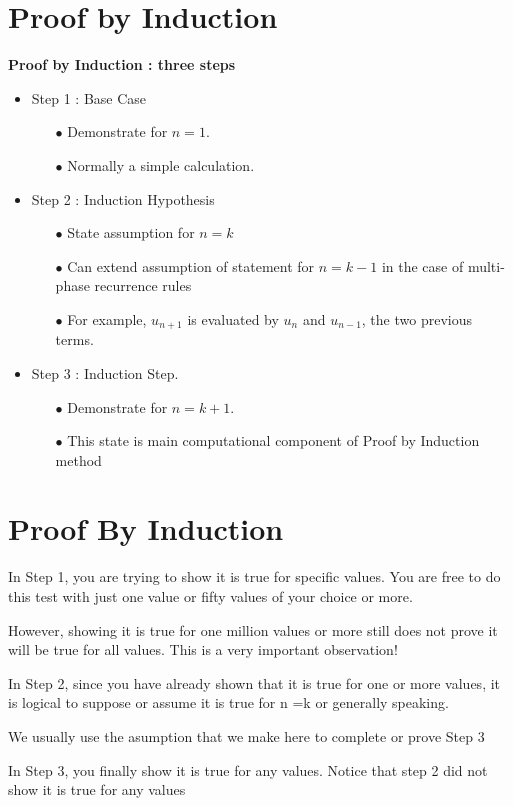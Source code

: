\documentclass[12pt]{article}
\begin{document}
\section{Proof by Induction}


\textbf{Proof by Induction :  three steps}
\begin{itemize}
\item Step 1 : Base Case
\begin{itemize}
\item[$\bullet$]  Demonstrate for $n=1$.
\item[$\bullet$]  Normally a simple calculation.
\end{itemize}
\item Step 2 : Induction Hypothesis 

\begin{itemize}
\item[$\bullet$] State assumption for $n=k$
\item[$\bullet$]  Can extend assumption of statement for $n=k-1$ in the case of multi-phase recurrence rules 
\item[$\bullet$] For example, $u_{n+1}$ is evaluated by $u_{n}$ and $u_{n-1}$, the two previous terms.
\end{itemize}

\item Step 3 : Induction Step.
\begin{itemize}
\item[$\bullet$]  Demonstrate for $n=k+1$.
\item[$\bullet$] 
This state is main computational component of Proof by Induction method
\end{itemize}
\end{itemize}




\section{Proof By Induction}
In Step 1, you are trying to show it is true for specific values. You are free to do this test with just one value or fifty values of your choice or more.

However, showing it is true for one million values or more still does not prove it will be true for all values. This is a very important observation!

In Step 2, since you have already shown that it is true for one or more values, it is logical to suppose or assume it is true for n =k or generally speaking.

We usually use the asumption that we make here to complete or prove Step  3

In Step 3, you finally show it is true for any values. Notice that step 2 did not show it is true for any values
\end{document}
